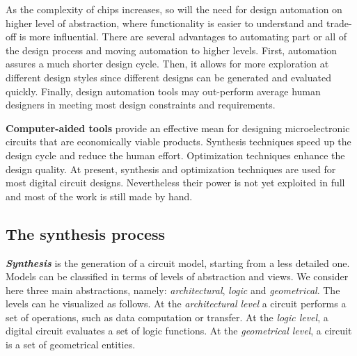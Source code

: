 As the complexity of chips increases, so will the need for design automation on higher level of abstraction, where functionality is easier to understand and trade-\/off is more influential. There are several advantages to automating part or all of the design process and moving automation to higher levels. First, automation assures a much shorter design cycle. Then, it allows for more exploration at different design styles since different designs can be generated and evaluated quickly. Finally, design automation tools may out-\/perform average human designers in meeting most design constraints and requirements.

{\bfseries Computer-\/aided tools} provide an effective mean for designing microelectronic circuits that are economically viable products. Synthesis techniques speed up the design cycle and reduce the human effort. Optimization techniques enhance the design quality. At present, synthesis and optimization techniques are used for most digital circuit designs. Nevertheless their power is not yet exploited in full and most of the work is still made by hand.\hypertarget{src_HLS_page_sec_synthesis}{}\subsection{The synthesis process}\label{src_HLS_page_sec_synthesis}
{\itshape {\bfseries Synthesis}} is the generation of a circuit model, starting from a less detailed one. Models can be classified in terms of levels of abstraction and views. We consider here three main abstractions, namely\+: {\itshape architectural}, {\itshape logic} and {\itshape geometrical}. The levels can he visualized as follows. At the {\itshape architectural level} a circuit performs a set of operations, such as data computation or transfer. At the {\itshape logic level}, a digital circuit evaluates a set of logic functions. At the {\itshape geometrical level}, a circuit is a set of geometrical entities.


